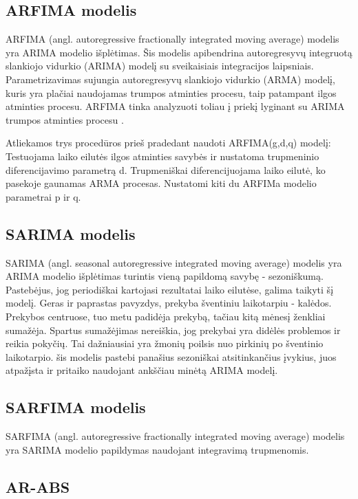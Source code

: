 \documentclass{VUMIFInfKursinis}
\begin{document}
\subsection {ARFIMA modelis}
ARFIMA (angl. autoregressive fractionally integrated moving average) modelis yra ARIMA modelio išplėtimas.
Šis modelis apibendrina autoregresyvų integruotą slankiojo vidurkio (ARIMA) modelį su sveikaisiais integracijos laipsniais.
Parametrizavimas sujungia autoregresyvų slankiojo vidurkio (ARMA) modelį, kuris yra plačiai naudojamas trumpos atminties procesu, taip 
patampant ilgos atminties procesu. ARFIMA tinka analyzuoti toliau į priekį lyginant su ARIMA trumpos atminties procesu \cite{samimi2009long}.

Atliekamos trys procedūros prieš pradedant naudoti ARFIMA(g,d,q) modelį:
Testuojama laiko eilutės ilgos atminties savybės ir nustatoma trupmeninio diferencijavimo parametrą d.
Trupmeniškai diferencijuojama laiko eilutė, ko pasekoje gaunamas ARMA procesas.
Nustatomi kiti du ARFIMa modelio parametrai p ir q.

\subsection {SARIMA modelis}
SARIMA (angl. seasonal autoregressive integrated moving average) modelis yra ARIMA modelio išplėtimas turintis vieną papildomą savybę - sezoniškumą. 
Pastebėjus, jog periodiškai kartojasi rezultatai laiko eilutėse, galima taikyti šį modelį. Geras ir paprastas pavyzdys, prekyba šventiniu laikotarpiu - kalėdos.
Prekybos centruose, tuo metu padidėja prekybą, tačiau kitą mėnesį ženkliai sumažėja. Spartus sumažėjimas nereiškia, jog prekybai yra didėlės problemos ir reikia pokyčių.
Tai dažniausiai yra žmonių poilsis nuo pirkinių po šventinio laikotarpio. šis modelis pastebi panašius sezoniškai atsitinkančius įvykius, juos atpažįsta ir pritaiko naudojant
ankščiau minėtą ARIMA modelį. 

\subsection {SARFIMA modelis}
SARFIMA (angl. autoregressive fractionally integrated moving average) modelis yra SARIMA modelio papildymas naudojant integravimą trupmenomis.

\subsection {AR-ABS}
\end{document}
